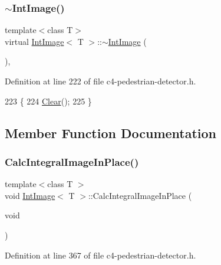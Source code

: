 \subsubsection{\texorpdfstring{$\sim$\+Int\+Image()}{~IntImage()}}
{\footnotesize\ttfamily template$<$class T$>$ \\
virtual \mbox{\hyperlink{class_int_image}{Int\+Image}}$<$ T $>$\+::$\sim$\mbox{\hyperlink{class_int_image}{Int\+Image}} (\begin{DoxyParamCaption}{ }\end{DoxyParamCaption})\hspace{0.3cm}{\ttfamily [inline]}, {\ttfamily [virtual]}}



Definition at line 222 of file c4-\/pedestrian-\/detector.\+h.


\begin{DoxyCode}
223     \{
224         \mbox{\hyperlink{class_int_image_a183a2bb5b576ab7a03010c0fff8f47cb}{Clear}}();
225     \}
\end{DoxyCode}


\subsection{Member Function Documentation}
\mbox{\label{class_int_image_a4b955bc5382ee4745a5ab92fc48b4a6a}} 
\subsubsection{\texorpdfstring{Calc\+Integral\+Image\+In\+Place()}{CalcIntegralImageInPlace()}}
{\footnotesize\ttfamily template$<$class T $>$ \\
void \mbox{\hyperlink{class_int_image}{Int\+Image}}$<$ T $>$\+::Calc\+Integral\+Image\+In\+Place (\begin{DoxyParamCaption}\item[{void}]{ }\end{DoxyParamCaption})}



Definition at line 367 of file c4-\/pedestrian-\/detector.\+h.


